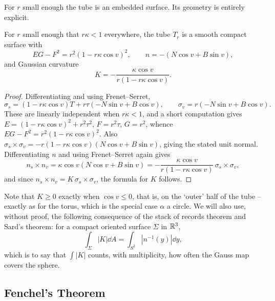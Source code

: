 \documentclass[a4paper]{scrartcl}
\begin{document}
For $r$ small enough the tube is an embedded surface. Its geometry is entirely explicit.

\begin{lemma}
    For $r$ small enough that $r\kappa < 1$ everywhere, the tube $T_r$ is a smooth compact surface with
    $$
    EG - F^2 = r^2\left(1 - r\kappa\cos v\right)^2, \qquad n = -\left(N\cos v + B \sin v\right),
    $$
    and Gaussian curvature
    $$
    K = -\frac{\kappa\cos v}{r\left(1-r\kappa\cos v\right)}.
    $$
\end{lemma}
\begin{proof}
    Differentiating and using Frenet--Serret,
    $$
    \sigma_s = \left(1 - r\kappa\cos v\right)T + r\tau\left(-N\sin v + B\cos v\right), \qquad \sigma_v = r\left(-N\sin v + B\cos v\right).
    $$
    These are linearly independent when $r\kappa < 1$, and a short computation gives $E = (1-r\kappa\cos v)^2 + r^2\tau^2$, $F = r^2\tau$, $G = r^2$, whence $EG - F^2 = r^2(1-r\kappa\cos v)^2$. Also $\sigma_s\times\sigma_v = -r(1-r\kappa\cos v)(N\cos v + B \sin v)$, giving the stated unit normal. Differentiating $n$ and using Frenet--Serret again gives
    $$
    n_s \times n_v = \kappa\cos v\left(N\cos v + B\sin v\right) = -\frac{\kappa\cos v}{r(1-r\kappa\cos v)}\,\sigma_s\times\sigma_v,
    $$
    and since $n_s\times n_v = K\,\sigma_s\times\sigma_v$, the formula for $K$ follows.
\end{proof}

Note that $K \geq 0$ exactly when $\cos v \leq 0$, that is, on the `outer' half of the tube -- exactly as for the torus, which is the special case $\alpha$ a circle. We will also use, without proof, the following consequence of the stack of records theorem and Sard's theorem: for a compact oriented surface $\Sigma$ in $\mathbb{R}^3$,
$$
\int_\Sigma |K| \dd A = \int_{S^2}\left|n^{-1}(y)\right|\dd y,
$$
which is to say that $\int|K|$ counts, with multiplicity, how often the Gauss map covers the sphere.

\subsection{Fenchel's Theorem}
\end{document}
